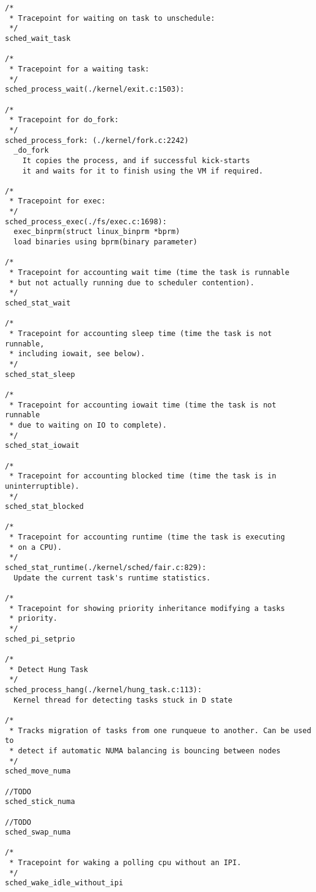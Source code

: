 \begin{Verbatim}
/*
 * Tracepoint for waiting on task to unschedule:
 */
sched_wait_task

/*
 * Tracepoint for a waiting task:
 */
sched_process_wait(./kernel/exit.c:1503):

/*
 * Tracepoint for do_fork:
 */
sched_process_fork: (./kernel/fork.c:2242)
  _do_fork
    It copies the process, and if successful kick-starts                                                                                                   
    it and waits for it to finish using the VM if required.

/*
 * Tracepoint for exec:
 */
sched_process_exec(./fs/exec.c:1698):
  exec_binprm(struct linux_binprm *bprm)
  load binaries using bprm(binary parameter)

/*
 * Tracepoint for accounting wait time (time the task is runnable
 * but not actually running due to scheduler contention).
 */
sched_stat_wait

/*
 * Tracepoint for accounting sleep time (time the task is not runnable,
 * including iowait, see below).
 */
sched_stat_sleep

/*
 * Tracepoint for accounting iowait time (time the task is not runnable
 * due to waiting on IO to complete).
 */
sched_stat_iowait

/*
 * Tracepoint for accounting blocked time (time the task is in uninterruptible).
 */
sched_stat_blocked

/*
 * Tracepoint for accounting runtime (time the task is executing
 * on a CPU).
 */
sched_stat_runtime(./kernel/sched/fair.c:829):
  Update the current task's runtime statistics.

/*
 * Tracepoint for showing priority inheritance modifying a tasks
 * priority.
 */
sched_pi_setprio

/*
 * Detect Hung Task
 */
sched_process_hang(./kernel/hung_task.c:113):
  Kernel thread for detecting tasks stuck in D state

/*
 * Tracks migration of tasks from one runqueue to another. Can be used to
 * detect if automatic NUMA balancing is bouncing between nodes
 */
sched_move_numa

//TODO
sched_stick_numa

//TODO
sched_swap_numa

/*
 * Tracepoint for waking a polling cpu without an IPI.
 */
sched_wake_idle_without_ipi
\end{Verbatim}